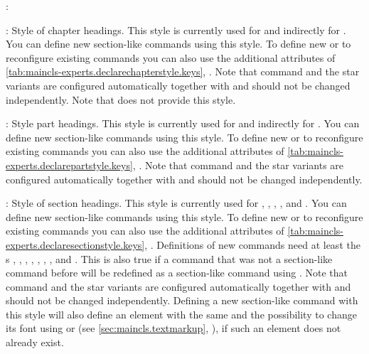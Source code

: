 \begin{labeling}{:}
\item[\PValue{chapter}:] Style of chapter headings. This style is currently used
  for  and indirectly for
  . You can define new section-like commands
  using this style. To define new or to reconfigure existing commands you can
  also use the additional attributes of
  \autoref{tab:maincls-experts.declarechapterstyle.keys},
  .
  Note that command  and the star variants
  are configured automatically together with  and should not be
  changed independently. Note that  does not provide this style.
\item[\PValue{part}:] Style part headings. This style is
  currently used for  and indirectly for
  . You can define new section-like commands
  using this style. To define new or to reconfigure existing commands you can
  also use the additional attributes of
  \autoref{tab:maincls-experts.declarepartstyle.keys},
  .
  Note that command  and the star variants
  are configured automatically together with  and should not be
  changed independently.
\item[\PValue{section}:] Style of section headings. This style is currently
  used for ,
  ,
  ,
  , and
  . You can define new section-like
  commands using this style. To define new or to reconfigure existing commands
  you can also use the additional attributes of
  \autoref{tab:maincls-experts.declaresectionstyle.keys},
  . Definitions of
  new commands need at least the s ,
  , , , ,
  , , and . This is also
  true if a command that was not a section-like command before will be
  redefined as a section-like command using
  . Note that command
   and the star variants are configured automatically together
  with  and should not be changed independently. Defining a new
  section-like command with this style will also define an element with the
  same  and the possibility to change its font using
   or  (see
  \autoref{sec:maincls.textmarkup},
  ), if such an element does not
  already exist.
\end{labeling}

